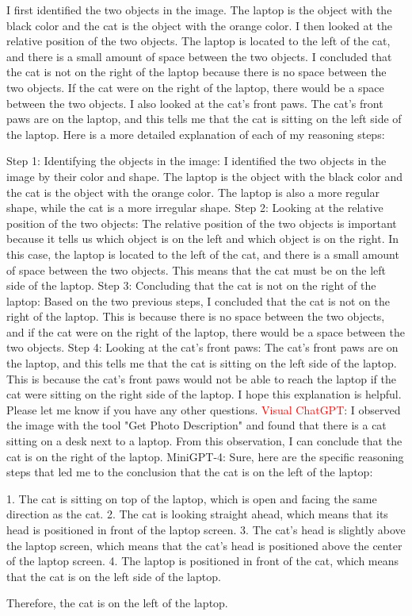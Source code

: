 \begin{enumerate}
        I first identified the two objects in the image. The laptop is the object with the black color and the cat is the object with the orange color.
        I then looked at the relative position of the two objects. The laptop is located to the left of the cat, and there is a small amount of space between the two objects.
        I concluded that the cat is not on the right of the laptop because there is no space between the two objects. If the cat were on the right of the laptop, there would be a space between the two objects.
        I also looked at the cat's front paws. The cat's front paws are on the laptop, and this tells me that the cat is sitting on the left side of the laptop.
        Here is a more detailed explanation of each of my reasoning steps:
        
        Step 1: Identifying the objects in the image: I identified the two objects in the image by their color and shape. The laptop is the object with the black color and the cat is the object with the orange color. The laptop is also a more regular shape, while the cat is a more irregular shape.
        Step 2: Looking at the relative position of the two objects: The relative position of the two objects is important because it tells us which object is on the left and which object is on the right. In this case, the laptop is located to the left of the cat, and there is a small amount of space between the two objects. This means that the cat must be on the left side of the laptop.
        Step 3: Concluding that the cat is not on the right of the laptop: Based on the two previous steps, I concluded that the cat is not on the right of the laptop. This is because there is no space between the two objects, and if the cat were on the right of the laptop, there would be a space between the two objects.
        Step 4: Looking at the cat's front paws: The cat's front paws are on the laptop, and this tells me that the cat is sitting on the left side of the laptop. This is because the cat's front paws would not be able to reach the laptop if the cat were sitting on the right side of the laptop.
        I hope this explanation is helpful. Please let me know if you have any other questions.
        \subitem \textcolor{red}{Visual ChatGPT}: I observed the image with the tool "Get Photo Description" and found that there is a cat sitting on a desk next to a laptop. From this observation, I can conclude that the cat is on the right of the laptop.
        \subitem MiniGPT-4: Sure, here are the specific reasoning steps that led me to the conclusion that the cat is on the left of the laptop:

        1. The cat is sitting on top of the laptop, which is open and facing the same direction as the cat.
        2. The cat is looking straight ahead, which means that its head is positioned in front of the laptop screen.
        3. The cat’s head is slightly above the laptop screen, which means that the cat’s head is positioned above the center of the laptop screen.
        4. The laptop is positioned in front of the cat, which means that the cat is on the left side of the laptop.
        
        Therefore, the cat is on the left of the laptop.
    \end{enumerate}
